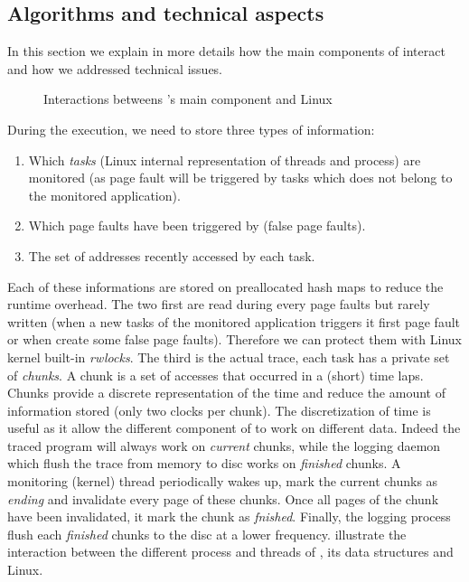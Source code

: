 \subsection{Algorithms and technical aspects}
\label{sec:design-tech}

In this section we explain in more details how the main components of \Moca
interact and how we addressed technical issues.

\begin{figure}[htb]
    \centering
    \caption{Interactions betweens \Moca's main component and Linux}
    \label{fig:moca}
\end{figure}


During the execution, we need to store three types of information:
\begin{enumerate}
    \item Which \emph{tasks} (Linux internal representation of threads and process) are
monitored (as page fault will be triggered by tasks which does not belong to
the monitored application).
    \item Which page faults have been triggered by \Moca (false page faults).
    \item The set of addresses recently accessed by each task.
\end{enumerate}

Each of these informations are stored on preallocated hash maps to reduce the
runtime overhead.  The two first are read during every page faults but rarely
written (when a new tasks of the monitored application triggers it first page
fault or when \Moca create some false page faults). Therefore we can protect
them with Linux kernel built-in \emph{rwlocks}. The third is the actual
trace, each task has a private set of \emph{chunks}. A chunk is a set of
accesses that occurred in a (short) time laps.  Chunks provide a discrete
representation of the time and reduce the amount of information stored (only
two clocks per chunk). The discretization of time is useful as it allow the
different component of \Moca to work on different data.  Indeed the traced
program will always work on \emph{current} chunks, while the logging daemon
which flush the trace from memory to disc works on \emph{finished} chunks. A
monitoring (kernel) thread periodically wakes up, mark the current chunks as
\emph{ending} and invalidate every page of these chunks. Once all pages of the
chunk have been invalidated, it mark the chunk as \emph{fnished}. Finally, the
logging process flush each \emph{finished} chunks to the disc at a lower
frequency.   illustrate the interaction between the
different process and threads of \Moca, its data structures and Linux.

